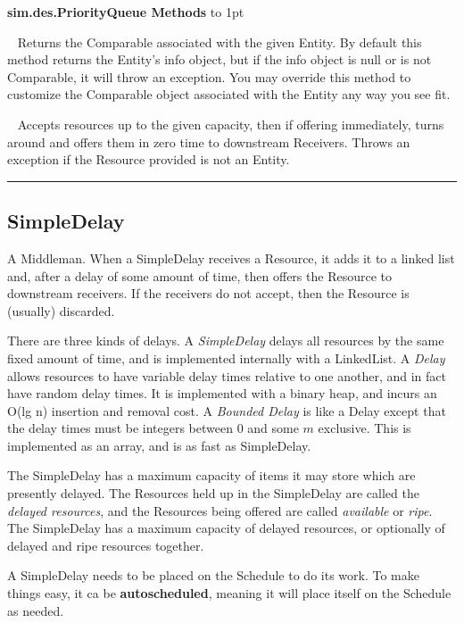 \documentclass[twoside,10pt]{article}
\newcommand\class[1]{\index{Classes!{#1}}\textsf{#1}}
\newcommand*{\xfill}[1][0pt]{%
	\cleaders
		\hbox to 1pt{\hss
			\raisebox{#1}{\rule{1.2pt}{0.4pt}}%
			\hss}\hfill}
\newenvironment{methods}[1]{
\vspace{1.0em}\noindent\textsf{\textbf{#1 Methods}}\quad \xfill[0.5ex]
\vspace{-0.25em}
\begin{description}
\small}
{\end{description}\hrule\vspace{1.5em}}
\newcommand{\mthd}[1]{\item[{\sf #1}]~\newline}
\begin{document}
\begin{methods}{\class{sim.des.PriorityQueue}}
\mthd{public Comparable getComparable(Entity entity)}
Returns the Comparable associated with the given Entity.  By default this method returns the Entity's info object, but if the info object is null or is not Comparable, it will throw an exception.  You may override this method to customize the Comparable object associated with the Entity any way you see fit.

\mthd{public boolean accept(Provider provider, Resource amount, double atLeast, double atMost)}
Accepts resources up to the given capacity, then if offering immediately, turns around and offers them in zero time to downstream Receivers.  Throws an exception if the Resource provided is not an Entity.
\end{methods}



\subsection{SimpleDelay}

A Middleman.  When a SimpleDelay receives a Resource, it adds it to a linked list and, after a delay of some amount of time, then offers the Resource to downstream receivers.  If the receivers do not accept, then the Resource is (usually) discarded.  

There are three kinds of delays.  A {\it SimpleDelay} delays all resources by the same fixed amount of time, and is implemented internally with a LinkedList.  A {\it Delay} allows resources to have variable delay times relative to one another, and in fact have random delay times.  It is implemented with a binary heap, and incurs an O(lg n) insertion and removal cost.  A {\it Bounded Delay} is like a Delay except that the delay times must be integers between 0 and some \(m\) exclusive.  This is implemented as an array, and is as fast as SimpleDelay.

The SimpleDelay has a maximum capacity of items it may store which are presently delayed.  The Resources held up in the SimpleDelay are called the {\it delayed resources}, and the Resources being offered are called {\it available} or {\it ripe}.  The SimpleDelay has a maximum capacity of delayed resources, or optionally of delayed and ripe resources together.

A SimpleDelay needs to be placed on the Schedule to do its work.  To make things easy, it ca be {\bf autoscheduled}, meaning it will place itself on the Schedule as needed.
\end{document}
